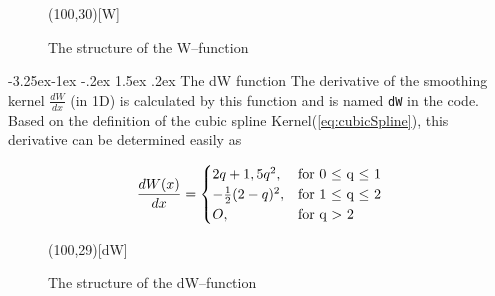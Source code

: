 \documentclass{report}
\makeatletter
\renewcommand\paragraph{\@startsection{paragraph}{4}{\z@}%
  {-3.25ex\@plus -1ex \@minus -.2ex}%
  {1.5ex \@plus .2ex}%
  {\normalfont\normalsize\bfseries}}
\makeatother
\begin{document}
\begin{figure}[H]
\label{fig:W_structure}  

\begin{center}
\begin{struktogramm}(100,30)[W]
    \caseend
\end{struktogramm}
\end{center}

\caption{The structure of the W--function}
\end{figure}

\paragraph{The dW function}
The derivative of the smoothing kernel $\frac{dW}{dx}$ (in 1D) is calculated by this function and is named {\tt dW} in the code. Based on the definition of the cubic spline Kernel(\ref{eq:cubicSpline}), this derivative can be determined easily as

\begin{equation}
\label{eq:cubicSplineDer}
\frac{dW(x)}{dx}=\begin{cases}
\-2q+1,5q^2,& \text{for 0 $\leq$ q $\leq$ 1} \\
-\frac{1}{2}(2-q)^{2},&  \text{for 1 $\leq$ q $\leq$ 2} \\
O,& \text{for q $>$ 2}
\end{cases}
\end{equation}


\begin{figure}[H]
\label{fig:dW_structure}  

\begin{center}
\begin{struktogramm}(100,29)[dW]
    \caseend

\end{struktogramm}
\end{center}

\caption{The structure of the dW--function}
\end{figure}
\end{document}

